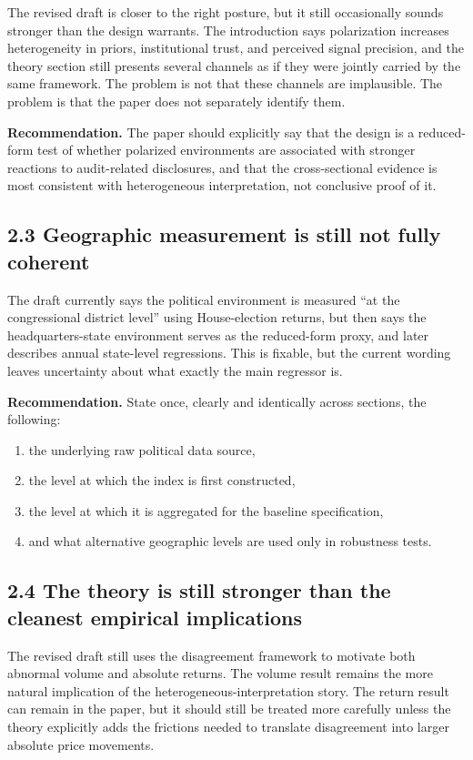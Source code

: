 \documentclass[11pt]{article}
\begin{document}
The revised draft is closer to the right posture, but it still occasionally sounds stronger than the design warrants. The introduction says polarization increases heterogeneity in priors, institutional trust, and perceived signal precision, and the theory section still presents several channels as if they were jointly carried by the same framework. The problem is not that these channels are implausible. The problem is that the paper does not separately identify them.

\textbf{Recommendation.} The paper should explicitly say that the design is a reduced-form test of whether polarized environments are associated with stronger reactions to audit-related disclosures, and that the cross-sectional evidence is most consistent with heterogeneous interpretation, not conclusive proof of it.

\subsection*{2.3 Geographic measurement is still not fully coherent}

The draft currently says the political environment is measured ``at the congressional district level'' using House-election returns, but then says the headquarters-state environment serves as the reduced-form proxy, and later describes annual state-level regressions. This is fixable, but the current wording leaves uncertainty about what exactly the main regressor is.

\textbf{Recommendation.} State once, clearly and identically across sections, the following:
\begin{enumerate}[leftmargin=1.5em]
    \item the underlying raw political data source,
    \item the level at which the index is first constructed,
    \item the level at which it is aggregated for the baseline specification,
    \item and what alternative geographic levels are used only in robustness tests.
\end{enumerate}

\subsection*{2.4 The theory is still stronger than the cleanest empirical implications}

The revised draft still uses the disagreement framework to motivate both abnormal volume and absolute returns. The volume result remains the more natural implication of the heterogeneous-interpretation story. The return result can remain in the paper, but it should still be treated more carefully unless the theory explicitly adds the frictions needed to translate disagreement into larger absolute price movements.
\end{document}
